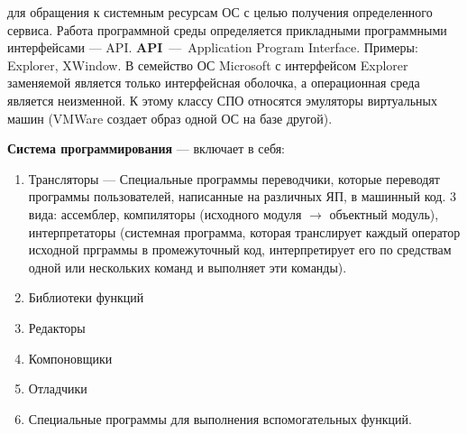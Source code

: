 для обращения к системным ресурсам ОС с целью получения определенного сервиса.
Работа программной среды определяется прикладными программными интерфейсами ---
API. \textbf{API}~---~Application Program Interface. Примеры: Explorer, XWindow.
В семейство ОС Microsoft с интерфейсом Explorer заменяемой является только
интерфейсная оболочка, а операционная среда является неизменной. К этому классу
СПО относятся эмуляторы виртуальных машин (VMWare создает образ одной ОС на базе
другой).\par
\textbf{Система программирования} --- включает в себя:
\begin{enumerate}
	\item Трансляторы --- Специальные программы переводчики, которые переводят
		программы пользователей, написанные на различных ЯП, в машинный код. 3 вида:
		ассемблер, компиляторы (исходного модуля $\rightarrow$ объектный модуль), 
		интерпретаторы (системная программа, которая транслирует каждый оператор
		исходной прграммы в промежуточный код, интерпретирует его по средствам одной
		или нескольких команд и выполняет эти команды). 
	\item Библиотеки функций
	\item Редакторы
	\item Компоновщики
	\item Отладчики
	\item Специальные программы для выполнения вспомогательных функций.
\end{enumerate}
